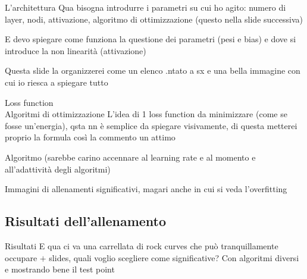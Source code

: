 \documentclass{beamer}
\begin{document}
\begin{frame}{L'architettura}
  Qua bisogna introdurre i parametri su cui ho agito: numero di layer, nodi, attivazione, algoritmo di ottimizzazione (questo nella slide successiva)

  E devo spiegare come funziona la questione dei parametri (pesi e bias) e dove si introduce la non linearità (attivazione)

  Questa slide la organizzerei come un elenco .ntato a sx e una bella immagine con cui io riesca a spiegare tutto 
\end{frame}

\begin{frame}{Loss function \\Algoritmi di ottimizzazione}
  L'idea di 1 loss function da minimizzare (come se fosse un'energia), qsta nn è semplice da spiegare visivamente, di questa metterei proprio la formula così la commento un attimo

  Algoritmo (sarebbe carino accennare al learning rate e al momento e all'adattività degli algoritmi)


  Immagini di allenamenti significativi, magari anche in cui si veda l'overfitting

\end{frame}

\subsection{Risultati dell'allenamento}
\begin{frame}{Risultati}
  E qua ci va una carrellata di rock curves che può tranquillamente occupare $+$ slides, quali voglio scegliere come significative? Con algoritmi diversi e mostrando bene il test point

\end{frame}
\end{document}
